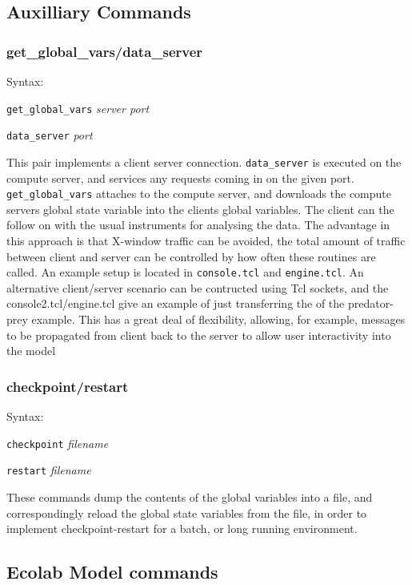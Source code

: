 \subsection{Auxilliary Commands}

\subsubsection{get\_global\_vars/data\_server}

Syntax:

{\tt get\_global\_vars} {\em server port}

{\tt data\_server} {\em port}

This pair implements a client server connection. {\tt data\_server} is
executed on the compute server, and services any requests coming in on
the given port. {\tt get\_global\_vars} attaches to the compute
server, and downloads the compute servers global state variable into
the clients global variables. The client can the follow on with the
usual instruments for analysing the data. The advantage in this
approach is that  X-window traffic can be avoided, the total amount of
traffic between client and server can be controlled by how often these
routines are called. An example setup is located in {\tt console.tcl}
and {\tt engine.tcl}. An alternative client/server scenario can be
contructed using Tcl sockets, and the console2.tcl/engine.tcl give an
example of just transferring the \bn{} of the predator-prey
example. This has a great deal of flexibility, allowing, for example,
messages to be propagated from client back to the server to allow user
interactivity into the model

\subsubsection{checkpoint/restart}

Syntax:

{\tt checkpoint} {\em filename}

{\tt restart} {\em filename}

These commands dump the contents of the global variables into a file,
and correspondingly reload the global state variables from the file,
in order to implement checkpoint-restart for a batch, or long running
environment. 

\subsection{Ecolab Model commands}

